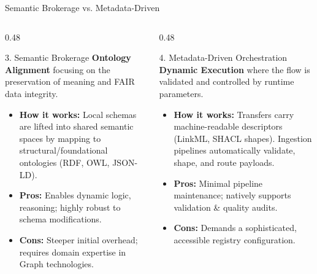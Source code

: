 \documentclass[aspectratio=169]{beamer}
\begin{document}
\begin{frame}{Semantic Brokerage vs. Metadata-Driven}
  \begin{columns}[t]
    \begin{column}{0.48\textwidth}
      \begin{block}{3. Semantic Brokerage}
        \scriptsize
        \textbf{Ontology Alignment} focusing on the preservation of meaning and FAIR data integrity.
        \vspace{0.5em}
        \begin{itemize}
          \item \textbf{How it works:} Local schemas are lifted into shared semantic spaces by mapping to structural/foundational ontologies (RDF, OWL, JSON-LD).
          \item \textbf{\textcolor{HMCMint}{Pros:}} Enables dynamic logic, reasoning; highly robust to schema modifications.
          \item \textbf{\textcolor{red!70}{Cons:}} Steeper initial overhead; requires domain expertise in Graph technologies.
        \end{itemize}
      \end{block}
    \end{column}
    
    \begin{column}{0.48\textwidth}
      \begin{block}{4. Metadata-Driven Orchestration}
        \scriptsize
        \textbf{Dynamic Execution} where the flow is validated and controlled by runtime parameters.
        \vspace{0.5em}
        \begin{itemize}
          \item \textbf{How it works:} Transfers carry machine-readable descriptors (LinkML, SHACL shapes). Ingestion pipelines automatically validate, shape, and route payloads.
          \item \textbf{\textcolor{HMCMint}{Pros:}} Minimal pipeline maintenance; natively supports validation \& quality audits.
          \item \textbf{\textcolor{red!70}{Cons:}} Demands a sophisticated, accessible registry configuration.
        \end{itemize}
      \end{block}
    \end{column}
  \end{columns}
\end{frame}
\end{document}
